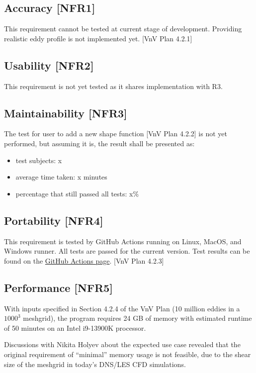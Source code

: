 \documentclass[12pt, titlepage]{article}
\begin{document}
\subsection{Accuracy [NFR1]}
This requirement cannot be tested at current stage of development. Providing realistic eddy profile is not implemented yet. [VnV Plan 4.2.1]

\subsection{Usability [NFR2]}
This requirement is not yet tested as it shares implementation with R3.

\subsection{Maintainability [NFR3]} 
The test for user to add a new shape function [VnV Plan 4.2.2] is not yet performed, but assuming it is, the result shall be presented as:

\begin{itemize}
  \item test subjects: x
  \item average time taken: x minutes
  \item percentage that still passed all tests: x\%
\end{itemize}

\subsection{Portability [NFR4]}

This requirement is tested by GitHub Actions running \progname{} on Linux, MacOS, and Windows runner. All tests are passed for the current version. Test results can be found on the \href{https://github.com/omltcat/turbulent-flow/actions/workflows/cross-platform.yaml}{GitHub Actions page}. [VnV Plan 4.2.3]
		
\subsection{Performance [NFR5]}
With inputs specified in Section 4.2.4 of the VnV Plan (10 million eddies in a $1000^3$ meshgrid), the program requires 24 GB of memory with estimated runtime of 50 minutes on an Intel i9-13900K processor. 

Discussions with Nikita Holyev about the expected use case revealed that the original requirement of ``minimal'' memory usage is not feasible, due to the shear size of the meshgrid in today's DNS/LES CFD simulations. 
	
\end{document}
